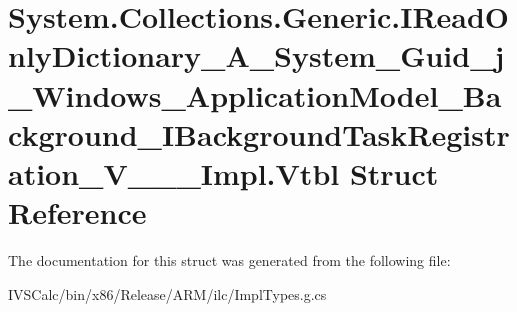 \hypertarget{struct_system_1_1_collections_1_1_generic_1_1_i_read_only_dictionary___a___system___guid__j___wied87a350b5ce782622c27853ebe8087b}{}\section{System.\+Collections.\+Generic.\+I\+Read\+Only\+Dictionary\+\_\+\+A\+\_\+\+System\+\_\+\+Guid\+\_\+j\+\_\+\+Windows\+\_\+\+Application\+Model\+\_\+\+Background\+\_\+\+I\+Background\+Task\+Registration\+\_\+\+V\+\_\+\+\_\+\+\_\+\+Impl.\+Vtbl Struct Reference}
\label{struct_system_1_1_collections_1_1_generic_1_1_i_read_only_dictionary___a___system___guid__j___wied87a350b5ce782622c27853ebe8087b}


The documentation for this struct was generated from the following file\+:\begin{DoxyCompactItemize}
\item 
I\+V\+S\+Calc/bin/x86/\+Release/\+A\+R\+M/ilc/Impl\+Types.\+g.\+cs\end{DoxyCompactItemize}
